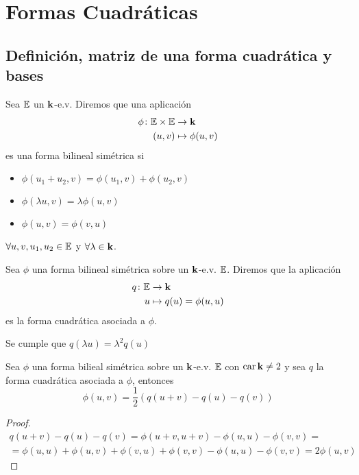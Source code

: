
\section{Formas Cuadráticas}

\subsection{Definición, matriz de una forma cuadrática y bases}

\begin{defi}
	Sea $\mathbb{E}$ un $\mathbf{k}$-e.v. Diremos que una aplicación
	\[
		\begin{aligned}
			\phi \colon \mathbb{E} \times \mathbb{E} &\to \mathbf{k} \\
			(u,v) &\mapsto \phi(u,v)
		\end{aligned}
	\]
	es una forma bilineal simétrica si \begin{itemize}
		\item $\phi(u_1 + u_2, v) = \phi(u_1, v) + \phi(u_2, v)$
		\item $\phi(\lambda u, v) = \lambda\phi(u,v)$
		\item $\phi(u,v) = \phi(v,u)$
	\end{itemize}
	$\forall u,v,u_1,u_2 \in \mathbb{E}$ y $\forall \lambda \in \mathbf{k}$.
\end{defi}
\begin{defi}
	Sea $\phi$ una forma bilineal simétrica sobre un $\mathbf{k}$-e.v. $\mathbb{E}$.
	Diremos que la aplicación
	\[
		\begin{aligned}
			q \colon \mathbb{E} &\to \mathbf{k} \\
			u &\mapsto q(u) = \phi(u,u)
		\end{aligned}
	\]
	es la forma cuadrática asociada a $\phi$.
\end{defi}
\begin{obs}
	Se cumple que $q(\lambda u) = \lambda^2 q(u)$
\end{obs}
\begin{lema}
	Sea $\phi$ una forma bilieal simétrica sobre un $\mathbf{k}$-e.v. $\mathbb{E}$ con $\operatorname{car} \mathbf{k} \neq 2$
	y sea $q$ la forma cuadrática asociada a $\phi$, entonces
	\[
		\phi(u,v) = \frac{1}{2} ( q(u+v) - q(u) - q(v))
	\]
\end{lema}
\begin{proof}
	\[
	\begin{split}
		q(u+v) - q(u) - q(v) = \phi(u+v,u+v) - \phi(u,u) - \phi(v,v) = \\
		=\phi(u,u) + \phi(u,v) + \phi(v,u)  + \phi(v,v) - \phi(u,u) - \phi(v,v) =
		2 \phi(u,v)
	\end{split}
	\]
\end{proof}

